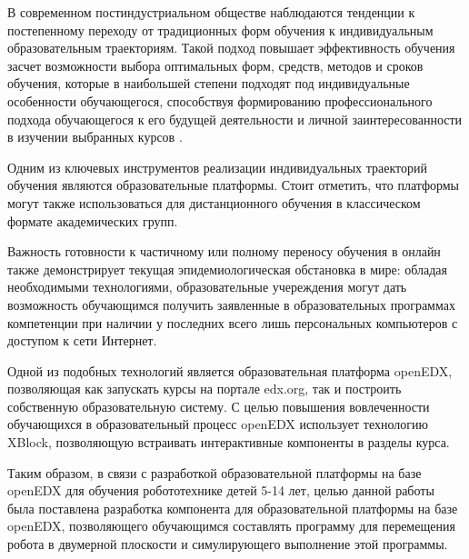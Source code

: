 \intro

В современном постиндустриальном обществе наблюдаются тенденции к постепенному переходу от традиционных форм обучения к индивидуальным образовательным траекториям. Такой подход повышает эффективность обучения засчет возможности выбора оптимальных форм, средств, методов и сроков обучения, которые в наибольшей степени подходят под индивидуальные особенности обучающегося, способствуя формированию профессионального подхода обучающегося к его будущей деятельности и личной заинтересованности в изучении выбранных курсов \cite{Furin}.

Одним из ключевых инструментов реализации индивидуальных траекторий обучения являются образовательные платформы. Стоит отметить, что платформы могут также использоваться для дистанционного обучения в классическом формате академических групп.

Важность готовности к частичному или полному переносу обучения в онлайн также демонстрирует текущая эпидемиологическая обстановка в мире: обладая необходимыми технологиями, образовательные учереждения могут дать возможность обучающимся получить заявленные в образовательных программах компетенции при наличии у последних всего лишь персональных компьютеров с доступом к сети Интернет.

Одной из подобных технологий является образовательная платформа openEDX, позволяющая как запускать курсы на портале edx.org, так и построить собственную образовательную систему. С целью повышения вовлеченности обучающихся в образовательный процесс openEDX использует технологию XBlock, позволяющую встраивать интерактивные компоненты в разделы курса.

Таким образом, в связи с разработкой образовательной платформы на базе openEDX для обучения робототехнике детей 5-14 лет, целью данной работы была поставлена разработка компонента для образовательной платформы на базе openEDX, позволяющего обучающимся составлять программу для перемещения робота в двумерной плоскости и симулирующего выполнение этой программы.